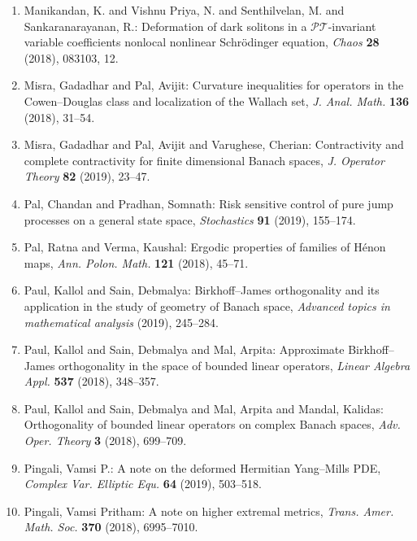 \begin{enumerate}[leftmargin=27pt]
	\item Manikandan, K. and Vishnu Priya, N. and Senthilvelan, M. and
	      Sankaranarayanan, R.: Deformation of dark solitons in a {$\mathcal{PT}$}-invariant
	      variable coefficients nonlocal nonlinear {S}chr\"{o}dinger
	      equation, {\em Chaos} {\bf 28} (2018), 083103, 12.

	\item Misra, Gadadhar and Pal, Avijit: Curvature inequalities for operators in the {C}owen--{D}ouglas
	      class and localization of the {W}allach set, {\em J. Anal. Math.} {\bf 136} (2018), 31--54.

	\item Misra, Gadadhar and Pal, Avijit and Varughese, Cherian: Contractivity and complete contractivity for finite dimensional Banach spaces, {\em J. Operator Theory} {\bf 82} (2019), 23--47.

	\item Pal, Chandan and Pradhan, Somnath: Risk sensitive control of pure jump processes on a general
	      state space, {\em Stochastics} {\bf 91} (2019), 155--174.

	\item Pal, Ratna and Verma, Kaushal: Ergodic properties of families of {H}\'{e}non maps, {\em Ann. Polon. Math.}
		      {\bf 121} (2018), 45--71.

	\item Paul, Kallol and Sain, Debmalya: Birkhoff--{J}ames orthogonality and its application in the
	      study of geometry of {B}anach space, {\em Advanced topics in mathematical analysis} {\bf } (2019), 245--284.

	\item Paul, Kallol and Sain, Debmalya and Mal, Arpita: Approximate {B}irkhoff--{J}ames orthogonality in the space of
	      bounded linear operators, {\em Linear Algebra Appl.} {\bf 537} (2018), 348--357.

	\item Paul, Kallol and Sain, Debmalya and Mal, Arpita and Mandal,
	      Kalidas: Orthogonality of bounded linear operators on complex {B}anach
	      spaces, {\em Adv. Oper. Theory} {\bf 3} (2018), 699--709.

	\item Pingali, Vamsi P.: A note on the deformed {H}ermitian {Y}ang--{M}ills {PDE}, {\em Complex Var. Elliptic Equ.}
		      {\bf 64} (2019), 503--518.

	\item Pingali, Vamsi Pritham: A note on higher extremal metrics, {\em Trans. Amer. Math. Soc.} {\bf 370} (2018), 6995--7010.


\end{enumerate}
